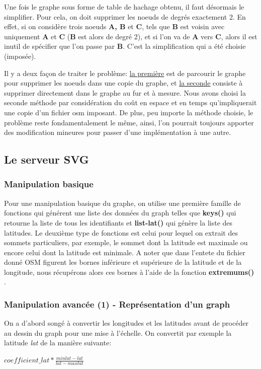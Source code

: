 \documentclass[french]{article}
\begin{document}
Une fois le graphe sous forme de table de hachage obtenu, il faut désormais le simplifier. Pour cela, on doit supprimer les noeuds de degrés exactement 2. En effet, si on considère trois noeuds \textbf{A, B} et \textbf{C}, tels que \textbf{B} est voisin avec uniquement \textbf{A} et \textbf{C} (\textbf{B} est alors de degré 2), et si l'on va de \textbf{A} vers \textbf{C}, alors il est inutil de spécifier que l'on passe par \textbf{B}. C'est la simplification qui a été choisie (imposée). \newline

Il y a deux façon de traiter le problème: \underline{la première} est de parcourir le graphe pour supprimer les noeuds dans une copie du graphe, et \underline{la seconde} consiste à supprimer directement dans le graphe au fur et à mesure. Nous avons choisi la seconde méthode par considération du coût en espace et en temps qu'impliquerait une copie d'un fichier osm imposant. De plus, peu importe la méthode choisie, le problème reste fondamentalement le même, ainsi, l'on pourrait toujours apporter des modification mineures pour passer d'une implémentation à une autre.
\label{osmgraph}
\subsection{Le serveur SVG}
\subsubsection{Manipulation basique}
Pour une manipulation basique du graphe, on utilise une première famille de fonctions qui générent une liste des données du graph telles que \textbf{keys()} qui retourne la liste de tous les identifiants et \textbf{list-lat()} qui génère la liste des latitudes. 
\newline
Le deuxième type de fonctions est celui pour lequel on extrait des sommets particuliers, par exemple, le sommet dont la latitude est maximale ou encore celui dont la latitude est minimale. A noter que dans l'entete du fichier donné OSM figurent les bornes inférieure et supérieure de la latitude et de la longitude, nous récupérons alors ces bornes à l'aide de la fonction \textbf{extremums()} .
\subsubsection{Manipulation avancée (1) - Représentation d'un graph}
On a d'abord songé à convertir les longitudes et les latitudes avant de procéder au dessin du graph pour une mise à l'échelle. On convertit par exemple la latitude \textit{lat} de la manière suivante: 
\newline
\begin{center}
    $coefficient\_lat * \frac{minlat-lat}{lat - maxlat}$
\end{center}
\end{document}
